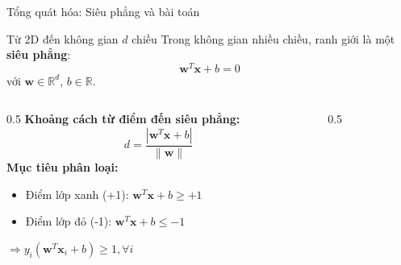 \begin{frame}{Tổng quát hóa: Siêu phẳng và bài toán}
  \begin{block}{Từ 2D đến không gian $d$ chiều}
    Trong không gian nhiều chiều, ranh giới là một \textbf{siêu phẳng}:
    \[
    \bm{w}^T \bm{x} + b = 0
    \]
    với $\bm{w} \in \mathbb{R}^d$, $b \in \mathbb{R}$.
  \end{block}

  \begin{columns}
    \begin{column}{0.5\textwidth}
      \textbf{Khoảng cách từ điểm đến siêu phẳng:}
      \[
      d = \frac{|\bm{w}^T \bm{x} + b|}{\|\bm{w}\|}
      \]
      \vspace{0.2cm}
      \textbf{Mục tiêu phân loại:}
      \begin{itemize}
        \item Điểm lớp xanh (+1): $\bm{w}^T \bm{x} + b \geq +1$
        \item Điểm lớp đỏ (-1): $\bm{w}^T \bm{x} + b \leq -1$
      \end{itemize}
      $\Rightarrow y_i (\bm{w}^T \bm{x}_i + b) \geq 1, \forall i$
    \end{column}
    \begin{column}{0.5\textwidth}
      \centering
    \end{column}
  \end{columns}
\end{frame}

